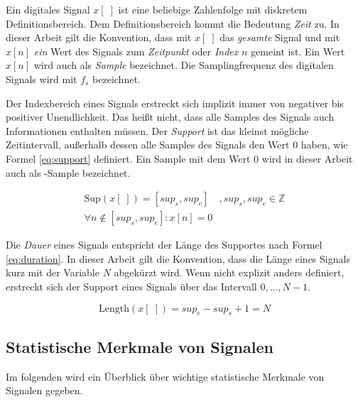 Ein digitales Signal $x[\;]$ ist eine beliebige Zahlenfolge mit diskretem Definitionsbereich. Dem Definitionsbereich kommt die Bedeutung \emph{Zeit} zu.\cite[S. 11-12]{dspGuide} In dieser Arbeit gilt die Konvention, dass mit $x[\;]$ das \emph{gesamte} Signal und mit $x[n]$ \emph{ein} Wert des Signals zum \emph{Zeitpunkt} oder \emph{Index} $n$ gemeint ist. Ein Wert $x[n]$ wird auch als \emph{Sample} bezeichnet. Die Samplingfrequenz des digitalen Signals wird mit $f_s$ bezeichnet.

Der Indexbereich eines Signals erstreckt sich implizit immer von negativer bis positiver Unendlichkeit. Das heißt nicht, dass alle Samples des Signals auch Informationen enthalten müssen. Der \emph{Support} ist das kleinst mögliche Zeitintervall, außerhalb dessen alle Samples des Signals den Wert 0 haben, wie Formel \ref{eq:support} definiert. Ein Sample mit dem Wert 0 wird in dieser Arbeit auch als -Sample\grqq{} bezeichnet.\cite[S. 24]{dspMichigan}

\begin{equation}
\label{eq:support}
\begin{split}
\text{Sup}(x[\;]) = [sup_s, sup_e] \quad , sup_s, sup_e \in \mathbb{Z} \\  \forall n \not\in [sup_s, sup_e] : x[n] = 0
\end{split}
\end{equation}

Die \emph{Dauer} eines Signals entspricht der Länge des Supportes nach Formel \ref{eq:duration}. In dieser Arbeit gilt die Konvention, dass die Länge eines Signals kurz mit der Variable $N$ abgekürzt wird. Wenn nicht explizit anders definiert, erstreckt sich der Support eines Signals über das Intervall $0 ,\ldots, N-1$.\cite[S. 24]{dspMichigan}

\begin{equation}
\text{Length}(x[\;]) = sup_e - sup_s + 1 = N
\label{eq:duration}
\end{equation}


\subsection{Statistische Merkmale von Signalen}

Im folgenden wird ein Überblick über wichtige statistische Merkmale von Signalen gegeben.

